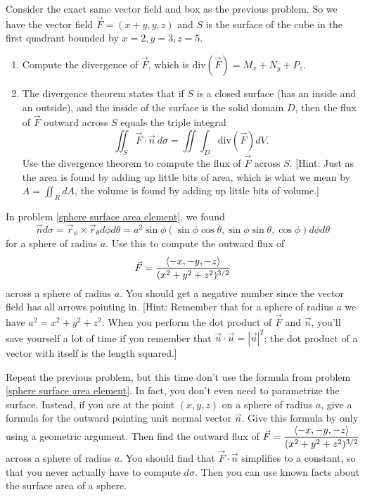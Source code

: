 \begin{problem}
 Consider the exact same vector field and box as the previous problem.  So  we have the vector field $\vec F=(x+y,y,z) $  and $S$ is the surface of the cube in the first quadrant bounded by {$ x=2,y=3,z=5 $}.
\begin{enumerate}
 \item Compute the divergence of $\vec F$, which is $\text{div}(\vec F) = M_x+N_y+P_z$.
 \item The divergence theorem states that if $S$ is a closed surface (has an inside and an outside), and the inside of the surface is the solid domain $D$, then the flux of $\vec F$ outward across $S$ equals the triple integral
$$\iint_S\vec F\cdot \vec n\ d\sigma = \iint\int_D \text{div}(\vec F)dV.$$
 Use the divergence theorem to compute the flux of $\vec F$ across $S$. [Hint: Just as the area is found by adding up little bits of area, which is what we mean by $A=\iint_R dA$, the volume is found by adding up little bits of volume.] 
\end{enumerate}
\end{problem}


\begin{problem}
In problem \ref{sphere surface area element}, we found 
$$\vec n d\sigma = \vec r_\phi\times \vec r_\theta d\phi d\theta = a^2\sin \phi (\sin\phi\cos\theta,\sin\phi\sin\theta,\cos\phi)d\phi d\theta$$ for a sphere of radius $a$.  
Use this to compute the outward flux of $$\displaystyle \vec F=\frac{\left<-x,-y,-z\right>}{(x^2+y^2+z^2)^{3/2}} $$ across a sphere of radius $a$. You should get a negative number since the vector field has all arrows pointing in. [Hint: Remember that for a sphere of radius $a$ we have $a^2=x^2+y^2+z^2$. When you perform the dot product of $\vec F$ and $\vec n$, you'll save yourself a lot of time if you remember that $\vec u\cdot \vec u = |\vec u|^2$; the dot product of a vector with itself is the length squared.]

\end{problem}


\begin{problem}
Repeat the previous problem, but this time don't use the formula from problem \ref{sphere surface area element}. In fact, you don't even need to parametrize the surface. Instead, if you are at the point $(x,y,z)$ on a sphere of radius $a$, give a formula for the outward pointing unit normal vector $\vec n$. Give this formula by only using a geometric argument.  Then find the outward flux of {$\displaystyle \vec F=\frac{\left<-x,-y,-z\right>}{(x^2+y^2+z^2)^{3/2}} $} across a sphere of radius $a$. You should find that $\vec F\cdot \vec n$ simplifies to a constant, so that you never actually have to compute $d\sigma$. Then you can use known facts about the surface area of a sphere.

\end{problem}


